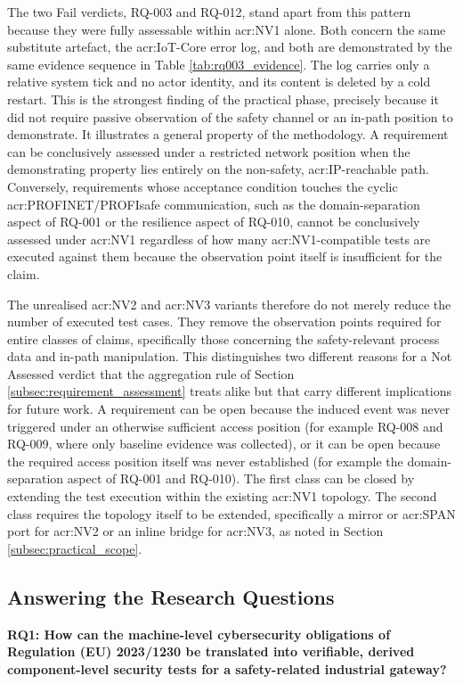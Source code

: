 The two Fail verdicts, RQ-003 and RQ-012, stand apart from this pattern because they were fully assessable within \gls{acr:NV1} alone. Both concern the same substitute artefact, the \gls{acr:IoT}-Core error log, and both are demonstrated by the same evidence sequence in Table \ref{tab:rq003_evidence}. The log carries only a relative system tick and no actor identity, and its content is deleted by a cold restart. This is the strongest finding of the practical phase, precisely because it did not require passive observation of the safety channel or an in-path position to demonstrate. It illustrates a general property of the methodology. A requirement can be conclusively assessed under a restricted network position when the demonstrating property lies entirely on the non-safety, \gls{acr:IP}-reachable path. Conversely, requirements whose acceptance condition touches the cyclic \gls{acr:PROFINET}/PROFIsafe communication, such as the domain-separation aspect of RQ-001 or the resilience aspect of RQ-010, cannot be conclusively assessed under \gls{acr:NV1} regardless of how many \gls{acr:NV1}-compatible tests are executed against them because the observation point itself is insufficient for the claim.

The unrealised \gls{acr:NV2} and \gls{acr:NV3} variants therefore do not merely reduce the number of executed test cases. They remove the observation points required for entire classes of claims, specifically those concerning the safety-relevant process data and in-path manipulation. This distinguishes two different reasons for a Not Assessed verdict that the aggregation rule of Section \ref{subsec:requirement_assessment} treats alike but that carry different implications for future work. A requirement can be open because the induced event was never triggered under an otherwise sufficient access position (for example RQ-008 and RQ-009, where only baseline evidence was collected), or it can be open because the required access position itself was never established (for example the domain-separation aspect of RQ-001 and RQ-010). The first class can be closed by extending the test execution within the existing \gls{acr:NV1} topology. The second class requires the topology itself to be extended, specifically a mirror or \gls{acr:SPAN} port for \gls{acr:NV2} or an inline bridge for \gls{acr:NV3}, as noted in Section \ref{subsec:practical_scope}.


\subsection{Answering the Research Questions}
\label{subsec:discussion_rq} 
\textbf{RQ1: How can the machine-level cybersecurity obligations of Regulation (EU) 2023/1230 be translated into verifiable, derived component-level security tests for a safety-related industrial gateway?} 

